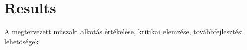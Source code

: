 \chapter{Results}
A megtervezett mûszaki alkotás értékelése, kritikai elemzése, továbbfejlesztési lehetõségek
